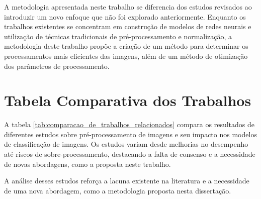 A metodologia apresentada neste trabalho se diferencia dos estudos revisados ao introduzir um novo enfoque que não foi explorado anteriormente. Enquanto os trabalhos existentes se concentram em construção de modelos de redes neurais e utilização de técnicas tradicionais de pré-processamento e normalização, a metodologia deste trabalho propõe a criação de um método para determinar os processamentos mais eficientes das imagens, além de um método de otimização dos parâmetros de processamento.

\section{Tabela Comparativa dos Trabalhos}

A tabela \ref{tab:comparacao_de_trabalhos_relacionados} compara os resultados de diferentes estudos sobre pré-processamento de imagens e seu impacto nos modelos de classificação de imagens. Os estudos variam desde melhorias no desempenho até riscos de sobre-processamento, destacando a falta de consenso e a necessidade de novas abordagens, como a proposta neste trabalho.

\begin{table}[h]
\centering
{}
\caption{Comparação dos trabalhos relacionados}
\label{tab:comparacao_de_trabalhos_relacionados}
\end{table}

A análise desses estudos reforça a lacuna existente na literatura e a necessidade de uma nova abordagem, como a metodologia proposta nesta dissertação.